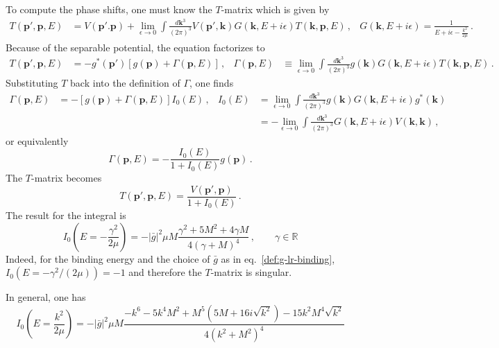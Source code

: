 \documentclass[
    aps,
    prl,
    showkeys,
    nofootinbib,
    floatfix
]{revtex4-1}
\renewcommand{\vec}[1]{\boldsymbol{#1}}
\begin{document}
To compute the phase shifts, one must know the $T$-matrix which is given by
\begin{align}
	T(\vec p', \vec p, E)
	&=
	V(\vec p'. \vec p) + \lim\limits_{\epsilon \to 0}\int \frac{d \vec k^3}{(2\pi)^3} V(\vec p', \vec k) G(\vec k, E + i \epsilon) T(\vec k, \vec p, E) \, ,
	&
	G(\vec k, E+ i \epsilon) = \frac{1}{E + i \epsilon - \frac{k^2}{2\mu}}
	\, .
\end{align}
Because of the separable potential, the equation factorizes to
\begin{align}
	T(\vec p', \vec p, E)
	&=
	- g^*(\vec p') \left[ g(\vec p) + \Gamma(\vec p, E) \right] \, ,
	&
	\Gamma(\vec p, E)
	&\equiv
	\lim\limits_{\epsilon \to 0}\int \frac{d \vec k^3}{(2\pi)^3} g(\vec k) G(\vec k, E + i \epsilon) T(\vec k, \vec p, E)
	\, .
\end{align}
Substituting $T$ back into the definition of $\Gamma$, one finds
\begin{align}
	\Gamma(\vec p, E)
	&= - \left[ g(\vec p) + \Gamma(\vec p, E) \right] I_0(E)
	\, , &
	I_0(E) &= \lim\limits_{\epsilon \to 0}\int \frac{d \vec k^3}{(2\pi)^3} g(\vec k) G(\vec k, E + i \epsilon) g^*(\vec k) 
	\\&&&= - \lim\limits_{\epsilon \to 0}\int \frac{d \vec k^3}{(2\pi)^3}  G(\vec k, E + i \epsilon) V(\vec k, \vec k)
	\, ,
\end{align}
or equivalently
\begin{equation}
	\Gamma(\vec p, E) = - \frac{I_0(E)}{1 + I_0(E)}g(\vec p) \, .
\end{equation}
The $T$-matrix becomes
\begin{equation}
	T(\vec p', \vec p, E)
	=
	\frac{V(\vec p', \vec p)}{1 + I_0(E)}
	\, .
\end{equation}
The result for the integral is
\begin{equation}
	I_0\left(E = - \frac{\gamma^2}{2\mu}\right)
	=
	- |\bar g|^2 \mu  M \frac{\gamma ^2+5 M^2+4 \gamma  M}{4(\gamma +M)^4}
	\, , \qquad
	\gamma \in \mathbb R
\end{equation}
Indeed, for the binding energy and the choice of $\bar g$ as in eq.~\eqref{def:g-lr-binding}, $I_0(E = - \gamma^2/(2\mu)) = -1$ and therefore the $T$-matrix is singular.

In general, one has
\begin{equation}
	I_0\left(E = \frac{k^2}{2\mu}\right)
	=
	-|\bar g|^2 \mu  M \frac{
		-k^6-5 k^4 M^2+M^5 \left(5 M+16 i \sqrt{k^2}\right)-15 k^2 M^4 \sqrt{k^2}
	}{
		4\left(k^2+M^2\right)^4
	}
\end{equation}
\end{document}
